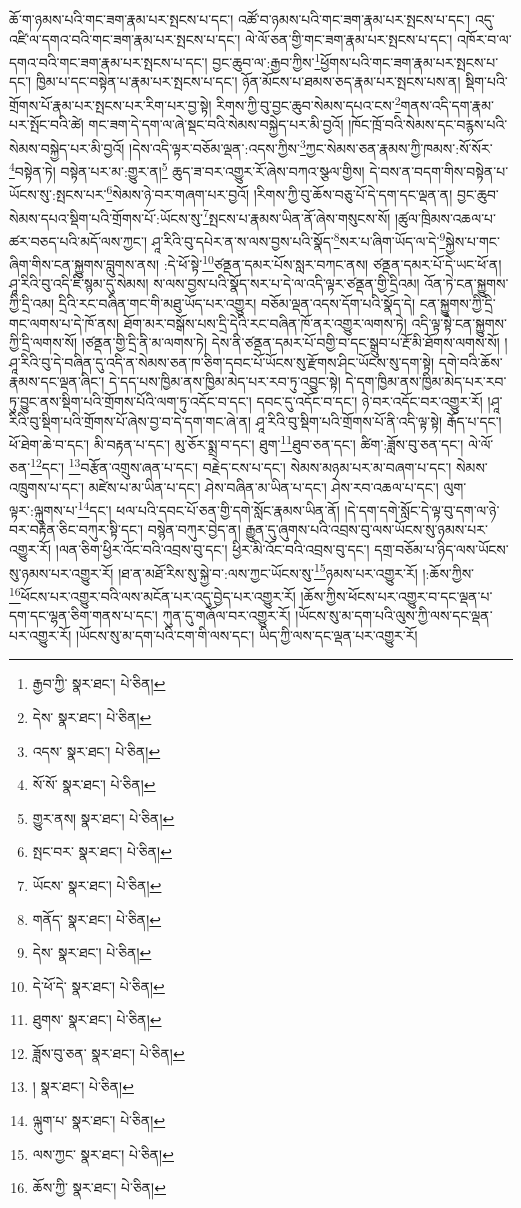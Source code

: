 ཆོ་ག་ཉམས་པའི་གང་ཟག་རྣམ་པར་སྤངས་པ་དང་། འཚོ་བ་ཉམས་པའི་གང་ཟག་རྣམ་པར་སྤངས་པ་དང་། འདུ་འཛི་ལ་དགའ་བའི་གང་ཟག་རྣམ་པར་སྤངས་པ་དང་། ལེ་ལོ་ཅན་གྱི་གང་ཟག་རྣམ་པར་སྤངས་པ་དང་། འཁོར་བ་ལ་དགའ་བའི་གང་ཟག་རྣམ་པར་སྤངས་པ་དང་། བྱང་ཆུབ་ལ་:རྒྱབ་ཀྱིས་\footnote{རྒྱབ་ཀྱི་  སྣར་ཐང་།  པེ་ཅིན། }ཕྱོགས་པའི་གང་ཟག་རྣམ་པར་སྤངས་པ་དང་། ཁྱིམ་པ་དང་བསྟེན་པ་རྣམ་པར་སྤངས་པ་དང་། ཉོན་མོངས་པ་ཐམས་ཅད་རྣམ་པར་སྤངས་པས་ན། སྡིག་པའི་གྲོགས་པོ་རྣམ་པར་སྤངས་པར་རིག་པར་བྱ་སྟེ། རིགས་ཀྱི་བུ་བྱང་ཆུབ་སེམས་དཔའ་ངས་\footnote{དེས་  སྣར་ཐང་།  པེ་ཅིན། }གནས་འདི་དག་རྣམ་པར་སྤོང་བའི་ཚེ། གང་ཟག་དེ་དག་ལ་ཞེ་སྡང་བའི་སེམས་བསྐྱེད་པར་མི་བྱའོ། །ཁོང་ཁྲོ་བའི་སེམས་དང་བརྙས་པའི་སེམས་བསྐྱེད་པར་མི་བྱའོ། །དེས་འདི་ལྟར་བཅོམ་ལྡན་:འདས་ཀྱིས་\footnote{འདས་  སྣར་ཐང་།  པེ་ཅིན། }ཀྱང་སེམས་ཅན་རྣམས་ཀྱི་ཁམས་:སོ་སོར་\footnote{སོ་སོ་  སྣར་ཐང་།  པེ་ཅིན། }བསྟེན་ཏེ། བསྟེན་པར་མ་:གྱུར་ན།\footnote{གྱུར་ནས།  སྣར་ཐང་།  པེ་ཅིན། } ཆུད་ཟ་བར་འགྱུར་རོ་ཞེས་བཀའ་སྩལ་གྱིས། དེ་བས་ན་བདག་གིས་བསྟེན་པ་ཡོངས་སུ་:སྤངས་པར་\footnote{སྤང་བར་  སྣར་ཐང་།  པེ་ཅིན། }སེམས་ཉེ་བར་གཞག་པར་བྱའོ། །རིགས་ཀྱི་བུ་ཆོས་བཅུ་པོ་དེ་དག་དང་ལྡན་ན། བྱང་ཆུབ་སེམས་དཔའ་སྡིག་པའི་གྲོགས་པོ་:ཡོངས་སུ་\footnote{ཡོངས་  སྣར་ཐང་།  པེ་ཅིན། }སྤངས་པ་རྣམས་ཡིན་ནོ་ཞེས་གསུངས་སོ། །ཚུལ་ཁྲིམས་འཆལ་པ་ཚར་བཅད་པའི་མདོ་ལས་ཀྱང་། ཤཱ་རིའི་བུ་དཔེར་ན་ས་ལས་བྱས་པའི་སྣོད་\footnote{གནོད་  སྣར་ཐང་།  པེ་ཅིན། }སར་པ་ཞིག་ཡོད་ལ་དེ་\footnote{དེས་  སྣར་ཐང་།  པེ་ཅིན། }སྐྱེས་པ་གང་ཞིག་གིས་ངན་སྐྱུགས་བླུགས་ནས། :དེ་ཕོ་སྟེ་\footnote{དེ་ཕོ་དེ་  སྣར་ཐང་།  པེ་ཅིན། }ཙནྡན་དམར་པོས་སླར་བཀང་ནས། ཙནྡན་དམར་པོ་དེ་ཡང་ཕོ་ན། ཤཱ་རིའི་བུ་འདི་ཇི་སྙམ་དུ་སེམས། ས་ལས་བྱས་པའི་སྣོད་སར་པ་དེ་ལ་འདི་ལྟར་ཙནྡན་གྱི་དྲིའམ། འོན་ཏེ་ངན་སྐྱུགས་ཀྱི་དྲི་འམ། དྲིའི་རང་བཞིན་གང་གི་མཐུ་ཡོད་པར་འགྱུར། བཅོམ་ལྡན་འདས་དོག་པའི་སྣོད་དེ། ངན་སྐྱུགས་ཀྱི་དྲི་གང་ལགས་པ་དེ་ཁོ་ནས། ཐོག་མར་བསྒོས་པས་དྲི་དེའི་རང་བཞིན་ཁོ་ནར་འགྱུར་ལགས་ཏེ། འདི་ལྟ་སྟེ་ངན་སྐྱུགས་ཀྱི་དྲི་ལགས་སོ། །ཙནྡན་གྱི་དྲི་ནི་མ་ལགས་ཏེ། དེས་ནི་ཙནྡན་དམར་པོ་བགྱི་བ་དང་སྒྲུབ་པ་རྔོ་མི་ཐོགས་ལགས་སོ། །ཤཱ་རིའི་བུ་དེ་བཞིན་དུ་འདི་ན་སེམས་ཅན་ཁ་ཅིག་དབང་པོ་ཡོངས་སུ་རྫོགས་ཤིང་ཡོངས་སུ་དག་སྟེ། དགེ་བའི་ཆོས་རྣམས་དང་ལྡན་ཞིང་། དེ་དད་པས་ཁྱིམ་ནས་ཁྱིམ་མེད་པར་རབ་ཏུ་འབྱུང་སྟེ། དེ་དག་ཁྱིམ་ནས་ཁྱིམ་མེད་པར་རབ་ཏུ་བྱུང་ནས་སྡིག་པའི་གྲོགས་པོའི་ལག་ཏུ་འདོང་བ་དང་། དབང་དུ་འདོང་བ་དང་། ཉེ་བར་འདོང་བར་འགྱུར་རོ། །ཤཱ་རིའི་བུ་སྡིག་པའི་གྲོགས་པོ་ཞེས་བྱ་བ་དེ་དག་གང་ཞེ་ན། ཤཱ་རིའི་བུ་སྡིག་པའི་གྲོགས་པོ་ནི་འདི་ལྟ་སྟེ། རྒོད་པ་དང་། ཕོ་ཐེག་ཆེ་བ་དང་། མི་བརྟན་པ་དང་། མུ་ཅོར་སྨྲ་བ་དང་། ཐུག་\footnote{ཐུགས་  སྣར་ཐང་།  པེ་ཅིན། }ཐུབ་ཅན་དང་། ཚིག་:ཟློས་བུ་ཅན་དང་། ལེ་ལོ་ཅན་\footnote{ཟློས་བུ་ཅན་  སྣར་ཐང་།  པེ་ཅིན། }དང་། \footnote{།    སྣར་ཐང་།  པེ་ཅིན། }བརྩོན་འགྲུས་ཞན་པ་དང་། བརྗེད་ངས་པ་དང་། སེམས་མཉམ་པར་མ་བཞག་པ་དང་། སེམས་འཁྲུགས་པ་དང་། མཛེས་པ་མ་ཡིན་པ་དང་། ཤེས་བཞིན་མ་ཡིན་པ་དང་། ཤེས་རབ་འཆལ་པ་དང་། ལུག་ལྟར་:ལྐུགས་པ་\footnote{ལྐུག་པ་  སྣར་ཐང་།  པེ་ཅིན། }དང་། ཕལ་པའི་དབང་པོ་ཅན་གྱི་དགེ་སློང་རྣམས་ཡིན་ནོ། །དེ་དག་དགེ་སློང་དེ་ལྟ་བུ་དག་ལ་ཉེ་བར་བརྟེན་ཅིང་བཀུར་སྟི་དང་། བསྙེན་བཀུར་བྱེད་ན། རྒྱུན་དུ་ཞུགས་པའི་འབྲས་བུ་ལས་ཡོངས་སུ་ཉམས་པར་འགྱུར་རོ། །ལན་ཅིག་ཕྱིར་འོང་བའི་འབྲས་བུ་དང་། ཕྱིར་མི་འོང་བའི་འབྲས་བུ་དང་། དགྲ་བཅོམ་པ་ཉིད་ལས་ཡོངས་སུ་ཉམས་པར་འགྱུར་རོ། །ཐ་ན་མཐོ་རིས་སུ་སྐྱེ་བ་:ལས་ཀྱང་ཡོངས་སུ་\footnote{ལས་ཀྱང་  སྣར་ཐང་།  པེ་ཅིན། }ཉམས་པར་འགྱུར་རོ། །:ཆོས་ཀྱིས་\footnote{ཆོས་ཀྱི་  སྣར་ཐང་།  པེ་ཅིན། }ཕོངས་པར་འགྱུར་བའི་ལས་མངོན་པར་འདུ་བྱེད་པར་འགྱུར་རོ། །ཆོས་ཀྱིས་ཕོངས་པར་འགྱུར་བ་དང་ལྡན་པ་དག་དང་ལྷན་ཅིག་གནས་པ་དང་། ཀུན་དུ་གཞོལ་བར་འགྱུར་རོ། །ཡོངས་སུ་མ་དག་པའི་ལུས་ཀྱི་ལས་དང་ལྡན་པར་འགྱུར་རོ། །ཡོངས་སུ་མ་དག་པའི་ངག་གི་ལས་དང་། ཡིད་ཀྱི་ལས་དང་ལྡན་པར་འགྱུར་རོ། 